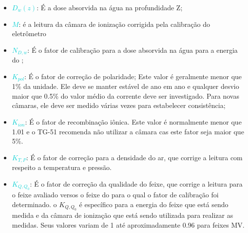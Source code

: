 \documentclass[11pt,a4paper]{article}
\newcounter{exemplo}
\begin{document}
	\begin{exemplo}[onde:]
		\begin{itemize}[label=\textcolor{CarnationPink}{$\star$}]
			\item \textbf{\textcolor{DarkTurquoise}{$D_{w}(z)$}}: É a dose absorvida na água na profundidade Z;
			\item \textbf{\textcolor{DarkTurquoise}{$M$}}: é a leitura da câmara de ionização corrigida pela calibração do eletrômetro
			\item \textbf{\textcolor{DarkTurquoise}{$N_{D,w}$}}: É o fator de calibração para a dose absorvida na água para a energia do ;
			\item \textbf{\textcolor{DarkTurquoise}{$K_{pol}$}}: É o fator de correção de polaridade; Este valor é geralmente menor que 1\% da unidade. Ele deve se manter estável de ano em ano e qualquer desvio maior que 0.5\% do valor médio da corrente deve ser investigado. Para novas câmaras, ele deve ser medido várias vezes para estabelecer consistência; 
			\item \textbf{\textcolor{DarkTurquoise}{$K_{ion}$}}: É o fator de recombinação iônica. Este valor é normalmente menor que 1.01 e o TG-51 recomenda não utilizar a câmara cas este fator seja maior que 5\%. 
			\item \textbf{\textcolor{DarkTurquoise}{$K_{T,P}$}}: É o fator de correção para a densidade do ar, que corrige a leitura com respeito a temperatura e pressão. 
			\item \textbf{\textcolor{DarkTurquoise}{$K_{Q,Q_0}$}}: É o fator de correção da qualidade do feixe, que corrige a leitura para o feixe avaliado versos o feixe do  para o qual o fator de calibração foi determinado. o $K_{Q,Q_0}$ é específico para a energia do feixe que está sendo medida e da câmara de ionização que está sendo utilizada para realizar as medidas. Seus valores variam de 1 até aproximadamente 0.96 para feixes MV.
		\end{itemize}
	\end{exemplo}
\end{document}
